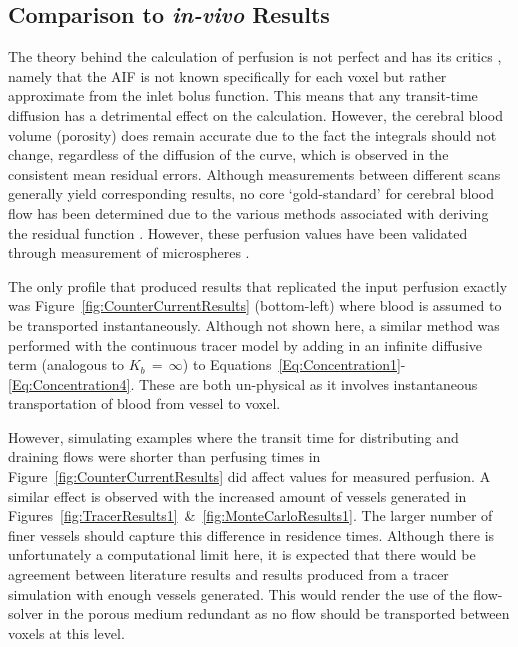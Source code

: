 \documentclass[11pt,english,a4paper,twoside,openright]{report}
\begin{document}
{{{{{{{\subsection{Comparison to \textit{in-vivo} Results}

The theory behind the calculation of perfusion is not perfect and has its critics \cite{lassen1984cerebral}, namely that the AIF is not known specifically for each voxel but rather approximate from the inlet bolus function. This means that any transit-time diffusion has a detrimental effect on the calculation. However, the cerebral blood volume (porosity) does remain accurate due to the fact the integrals should not change, regardless of the diffusion of the curve, which is observed in the consistent mean residual errors. Although measurements between different scans generally yield corresponding results, no core `gold-standard' for cerebral blood flow has been determined due to the various methods associated with deriving the residual function \cite{larsson2008dynamic}\cite{ito2004database}. However, these perfusion values have been validated through measurement of microspheres \cite{martin2000validation}. 

The only profile that produced results that replicated the input perfusion exactly was Figure~\ref{fig:CounterCurrentResults} (bottom-left) where blood is assumed to be transported instantaneously. Although not shown here, a similar method was performed with the continuous tracer model by adding in an infinite diffusive term (analogous to $K_{b}\,{=}\,{\infty}$) to Equations~\ref{Eq:Concentration1}-\ref{Eq:Concentration4}. These are both un-physical as it involves instantaneous transportation of blood from vessel to voxel.  

However, simulating examples where the transit time for distributing and draining flows were shorter than perfusing times in Figure~\ref{fig:CounterCurrentResults} did affect values for measured perfusion. A similar effect is observed with the increased amount of vessels generated in Figures~\ref{fig:TracerResults1}~\&~\ref{fig:MonteCarloResults1}. The larger number of finer vessels should capture this difference in residence times. Although there is unfortunately a computational limit here, it is expected that there would be agreement between literature results and results produced from a tracer simulation with enough vessels generated. This would render the use of the flow-solver in the porous medium redundant as no flow should be transported between voxels at this level. 

}}}}}}}
\end{document}
